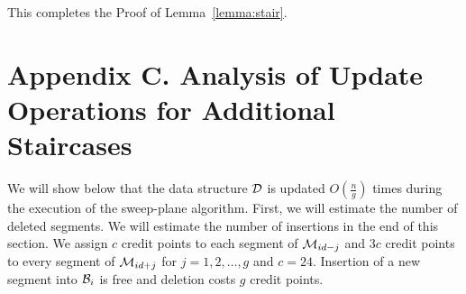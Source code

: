 \documentclass[10pt]{llncs}
\newcommand{\cD}{{\cal D}}
\newcommand{\cM}{{\cal M}}
\newcommand{\cB}{{\cal B}}
\begin{document}
This completes the Proof  of Lemma~\ref{lemma:stair}.


\section*{Appendix C. Analysis of Update Operations for Additional Staircases}
\label{sec:analys}
We will show below  that the data structure $\cD$ is updated $O(\frac{n}{g})$ 
times during the execution of the sweep-plane algorithm.
First, we will estimate the number of deleted segments.
We will estimate the number of insertions in the end of this section.
We assign $c$ credit points to each segment of $\cM_{id-j}$ and 
$3c$ credit points to every segment of $\cM_{id+j}$ for
$j=1,2,\ldots,g$ and $c= 24$.
Insertion of a new segment into $\cB_i$ is free and deletion 
costs $g$ credit points. 
\end{document}
